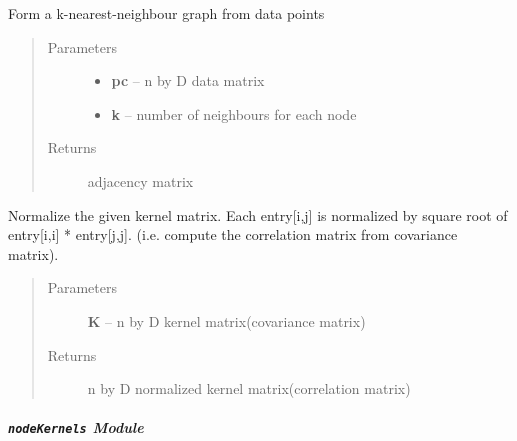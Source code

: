 \documentclass[letterpaper,10pt,english]{sphinxmanual}
\begin{document}
\begin{fulllineitems}
\label{pyGPs.GraphExtensions:pyGPs.GraphExtensions.graphUtil.formKnnGraph}
Form a k-nearest-neighbour graph from data points
\begin{quote}\begin{description}
\item[{Parameters}] \leavevmode\begin{itemize}
\item {} 
\textbf{pc} -- n by D data matrix

\item {} 
\textbf{k} -- number of neighbours for each node

\end{itemize}

\item[{Returns}] \leavevmode
adjacency matrix

\end{description}\end{quote}

\end{fulllineitems}


\begin{fulllineitems}
\label{pyGPs.GraphExtensions:pyGPs.GraphExtensions.graphUtil.normalizeKernel}
Normalize the given kernel matrix. 
Each entry{[}i,j{]} is normalized by square root of entry{[}i,i{]} * entry{[}j,j{]}.
(i.e. compute the correlation matrix from covariance matrix).
\begin{quote}\begin{description}
\item[{Parameters}] \leavevmode
\textbf{K} -- n by D kernel matrix(covariance matrix)

\item[{Returns}] \leavevmode
n by D normalized kernel matrix(correlation matrix)

\end{description}\end{quote}

\end{fulllineitems}



\subparagraph{\texttt{nodeKernels} Module}
\label{pyGPs.GraphExtensions:nodekernels-module}\label{pyGPs.GraphExtensions:module-pyGPs.GraphExtensions.nodeKernels}
\end{document}
